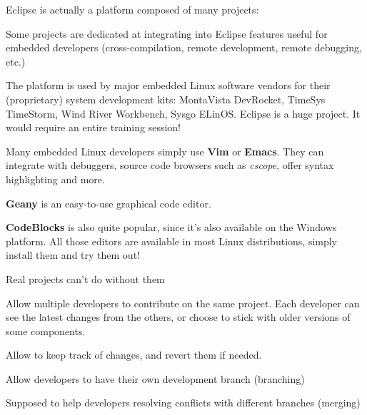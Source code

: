   \startitemize
  \item Eclipse is actually a platform composed of many projects:\\
    \startitemize
    \item Some projects are dedicated at integrating into Eclipse
      features useful for embedded developers (cross-compilation,
      remote development, remote debugging, etc.)
    \stopitemize
  \item The platform is used by major embedded Linux software vendors
    for their (proprietary) system development kits: MontaVista
    DevRocket, TimeSys TimeStorm, Wind River Workbench, Sysgo ELinOS.
  \stopitemize
  Eclipse is a huge project.  It would require an entire training
  session!

    \startitemize
    \item Many embedded Linux developers simply use {\bf Vim} or {\bf
        Emacs}. They can integrate with debuggers, source code browsers
      such as {\em cscope}, offer syntax highlighting and more.
    \item {\bf Geany} is an easy-to-use graphical code editor.
    \item {\bf CodeBlocks} is also quite popular, since it's also
      available on the Windows platform.
    \stopitemize
    All those editors are available in most Linux distributions, simply
    install them and try them out!

  Real projects can't do without them
  \startitemize
  \item Allow multiple developers to contribute on the same
    project. Each developer can see the latest changes from the
    others, or choose to stick with older versions of some components.
  \item Allow to keep track of changes, and revert them if needed.
  \item Allow developers to have their own development branch
    (branching)
  \item Supposed to help developers resolving conflicts with different
    branches (merging)
  \stopitemize

